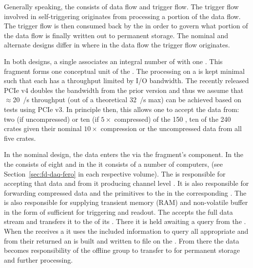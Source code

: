 Generally speaking, the  consists of data flow and trigger flow.
The trigger flow involved in self-triggering originates from
processing a portion of the data flow. 
The trigger flow is then consumed back by the  in order to govern
what portion of the data flow is finally written out to permanent
storage. 
The nominal and alternate designs differ in where in the data flow
the trigger flow originates. 

In both designs, a single  associates an integral
number of  with one .
This fragment forms one conceptual unit of the  .
The processing on a  is kept minimal such that each has a
throughput limited by I/O bandwidth. 
The recently released PCIe v4 doubles the bandwidth from the prior
version and thus we assume that $\approx$\SI{20}{\GB/\s} throughput (out of
a theoretical \SI{32}{\GB/\s} max) can be achieved based on tests
using PCIe v3.
In principle then, this allows one  to accept the data
from: two (if uncompressed) or ten (if $5\times$ compressed) of the
\num{150} \single {}, ten of the \num{240} \dual {} crates
given their nominal $10\times$ compression or the uncompressed data
from all five   crates.

In the nominal design, the data enters the  via the fragment's
 component.
In the  the  consists of eight 
and in the  it consists of a number of 
computers, (see Section~\ref{sec:fd-daq-fero} in each respective  volume).
The  is responsible for accepting that data and from it
producing channel level .
It is also responsible for forwarding compressed data and the
primitives to the  in the corresponding .
The  is also responsible for supplying transient memory
(RAM) and non-volatile buffer in the form of  sufficient
for  triggering and readout.
The  accepts the full data stream and transfers it to the
 of its . 
There it is held awaiting a query from the . 
When the  receives a  it uses the
included information to query all appropriate  and from
their returned  an  is built and
written to file on the . 
From there the data becomes responsibility of the offline group to
transfer to \fnal for permanent storage and further processing.

